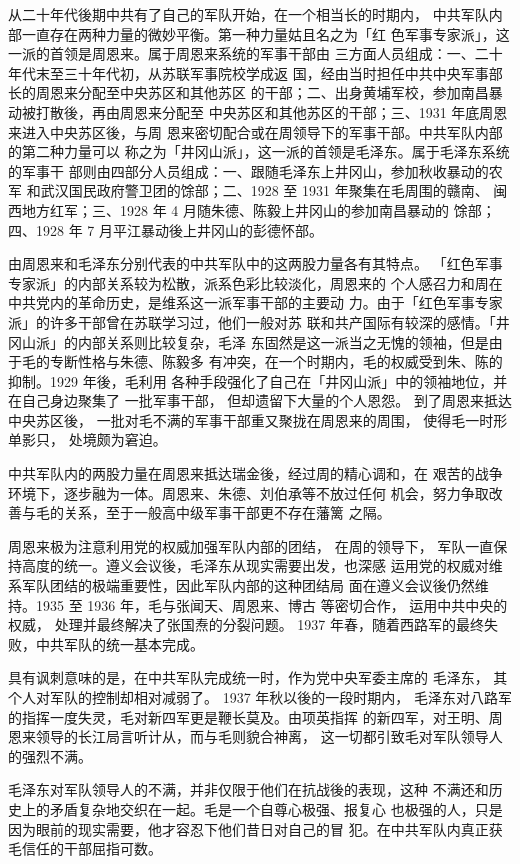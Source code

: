 从二十年代後期中共有了自己的军队开始，在一个相当长的时期内，
中共军队内部一直存在两种力量的微妙平衡。第一种力量姑且名之为「红
色军事专家派」，这一派的首领是周恩来。属于周恩来系统的军事干部由
三方面人员组成：一、二十年代末至三十年代初，从苏联军事院校学成返
国，经由当时担任中共中央军事部长的周恩来分配至中央苏区和其他苏区
的干部；二、出身黄埔军校，参加南昌暴动被打散後，再由周恩来分配至
中央苏区和其他苏区的干部；三、1931 年底周恩来进入中央苏区後，与周
恩来密切配合或在周领导下的军事干部。中共军队内部的第二种力量可以
称之为「井冈山派」，这一派的首领是毛泽东。属于毛泽东系统的军事干
部则由四部分人员组成：一、跟随毛泽东上井冈山，参加秋收暴动的农军
和武汉国民政府警卫团的馀部；二、1928 至 1931 年聚集在毛周围的赣南、
闽西地方红军；三、1928 年 4 月随朱德、陈毅上井冈山的参加南昌暴动的
馀部；四、1928 年 7 月平江暴动後上井冈山的彭德怀部。

由周恩来和毛泽东分别代表的中共军队中的这两股力量各有其特点。
「红色军事专家派」的内部关系较为松散，派系色彩比较淡化，周恩来的
个人感召力和周在中共党内的革命历史，是维系这一派军事干部的主要动
力。由于「红色军事专家派」的许多干部曾在苏联学习过，他们一般对苏
联和共产国际有较深的感情。「井冈山派」的内部关系则比较复杂，毛泽
东固然是这一派当之无愧的领袖，但是由于毛的专断性格与朱德、陈毅多
有冲突，在一个时期内，毛的权威受到朱、陈的抑制。1929 年後，毛利用
各种手段强化了自己在「井冈山派」中的领袖地位，并在自己身边聚集了
一批军事干部，
但却遗留下大量的个人恩怨。
到了周恩来抵达中央苏区後，
一批对毛不满的军事干部重又聚拢在周恩来的周围，
使得毛一时形单影只，
处境颇为窘迫。

中共军队内的两股力量在周恩来抵达瑞金後，经过周的精心调和，在
艰苦的战争环境下，逐步融为一体。周恩来、朱德、刘伯承等不放过任何
机会，努力争取改善与毛的关系，至于一般高中级军事干部更不存在藩篱
之隔。

周恩来极为注意利用党的权威加强军队内部的团结，
在周的领导下，
军队一直保持高度的统一。遵义会议後，毛泽东从现实需要出发，也深感
运用党的权威对维系军队团结的极端重要性，因此军队内部的这种团结局
面在遵义会议後仍然维持。1935 至 1936 年，毛与张闻天、周恩来、博古
等密切合作，
运用中共中央的权威，
处理并最终解决了张国焘的分裂问题。
1937 年春，随着西路军的最终失败，中共军队的统一基本完成。

具有讽刺意味的是，在中共军队完成统一时，作为党中央军委主席的
毛泽东，
其个人对军队的控制却相对减弱了。
1937 年秋以後的一段时期内，
毛泽东对八路军的指挥一度失灵，毛对新四军更是鞭长莫及。由项英指挥
的新四军，对王明、周恩来领导的长江局言听计从，而与毛则貌合神离，
这一切都引致毛对军队领导人的强烈不满。

毛泽东对军队领导人的不满，并非仅限于他们在抗战後的表现，这种
不满还和历史上的矛盾复杂地交织在一起。毛是一个自尊心极强、报复心
也极强的人，只是因为眼前的现实需要，他才容忍下他们昔日对自己的冒
犯。在中共军队内真正获毛信任的干部屈指可数。

